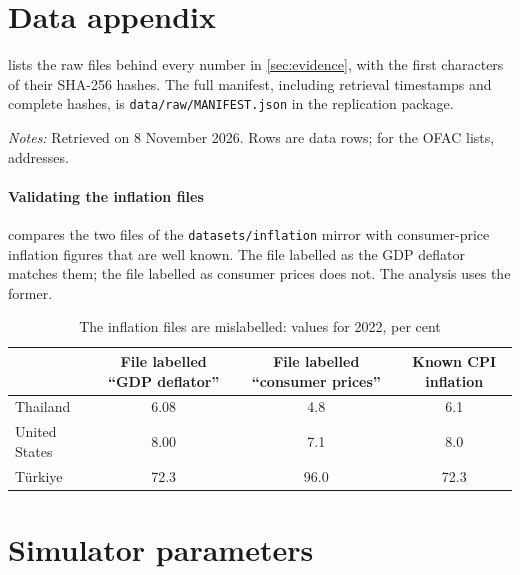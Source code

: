 \section{Data appendix}\label{app:data}

 lists the raw files behind every number in \cref{sec:evidence}, with the first characters of their
SHA-256 hashes. The full manifest, including retrieval timestamps and complete hashes, is
\texttt{data/raw/MANIFEST.json} in the replication package.

\begin{table}[!htbp]
\centering\footnotesize
\begin{threeparttable}
\caption{Raw data files used in the paper}
\label{tab:manifest}

\begin{tablenotes}[flushleft]\footnotesize
\item \emph{Notes:} Retrieved on 8 November 2026. Rows are data rows; for the OFAC lists, addresses.
\end{tablenotes}
\end{threeparttable}
\end{table}

\paragraph{Validating the inflation files}
 compares the two files of the \texttt{datasets/inflation} mirror with consumer-price inflation
figures that are well known. The file labelled as the GDP deflator matches them; the file labelled as consumer prices
does not. The analysis uses the former.

\begin{table}[!htbp]
\centering\footnotesize
\caption{The inflation files are mislabelled: values for 2022, per cent}
\label{tab:cpicheck}
\begin{tabular}{lccc}
\toprule
 & File labelled ``GDP deflator'' & File labelled ``consumer prices'' & Known CPI inflation \\
\midrule
Thailand & 6.08 & 4.8 & 6.1 \\
United States & 8.00 & 7.1 & 8.0 \\
Türkiye & 72.3 & 96.0 & 72.3 \\
\bottomrule
\end{tabular}
\end{table}

\section{Simulator parameters}\label{app:simparams}

